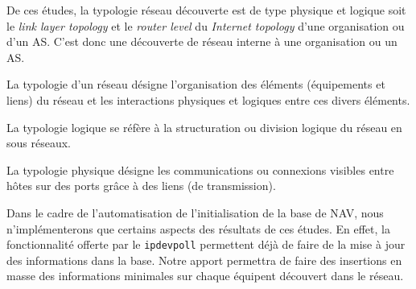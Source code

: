 De ces études, la typologie réseau découverte est de type physique et logique soit le \emph{link layer topology} et le \emph{router level} du \emph{Internet topology} d'une organisation ou d'un AS. C'est donc une découverte de réseau interne à une organisation ou un AS.

La typologie d'un réseau désigne l'organisation des éléments (équipements et liens) du réseau et les interactions physiques et logiques entre ces divers éléments.

La typologie logique se réfère à la structuration ou division logique du réseau en sous réseaux. %

La typologie physique désigne les communications ou connexions visibles entre hôtes sur des ports grâce à des liens (de transmission).

Dans le cadre de l'automatisation de l'initialisation de la base de NAV, nous n'implémenterons que certains aspects des résultats de ces études. En effet, la fonctionnalité offerte par le \texttt{ipdevpoll} permettent déjà de faire de la mise à jour des informations dans la base. Notre apport permettra de faire des insertions en masse des informations minimales sur chaque équipent découvert dans le réseau.

%
%

